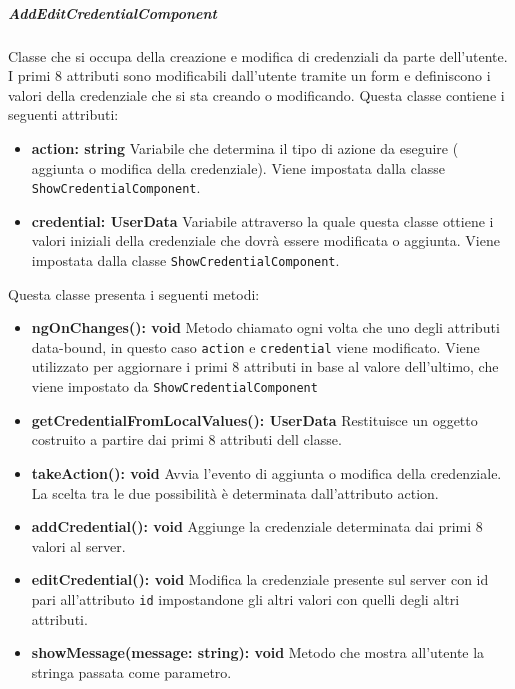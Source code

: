 \subparagraph{AddEditCredentialComponent}
Classe che si occupa della creazione e modifica di credenziali da parte dell'utente. I primi 8 attributi sono modificabili dall'utente tramite un form e definiscono i valori della credenziale che si sta creando o modificando. \newline
Questa classe contiene i seguenti attributi:
\begin{itemize}
	\item \textbf{action: string} \newline
	Variabile che determina il tipo di azione da eseguire ( aggiunta o modifica della credenziale). Viene impostata dalla classe \texttt{ShowCredentialComponent}.
	\item \textbf{credential: UserData} \newline
	Variabile attraverso la quale questa classe ottiene i valori iniziali della credenziale che dovrà essere modificata o aggiunta. Viene impostata dalla classe \texttt{ShowCredentialComponent}.
\end{itemize}
Questa classe presenta i seguenti metodi:
\begin{itemize}
	\item \textbf{ngOnChanges(): void} \newline
	Metodo chiamato ogni volta che uno degli attributi data-bound, in questo caso \texttt{action} e \texttt{credential} viene modificato. Viene utilizzato per aggiornare i primi 8 attributi in base al valore dell'ultimo, che viene impostato da \texttt{ShowCredentialComponent}
	\item \textbf{getCredentialFromLocalValues(): UserData} \newline
	Restituisce un oggetto costruito a partire dai primi 8 attributi dell classe.
	\item \textbf{takeAction(): void} \newline
	Avvia l'evento di aggiunta o modifica della credenziale. La scelta tra le due possibilità è determinata dall'attributo action.
	\item \textbf{addCredential(): void} \newline
	Aggiunge la credenziale determinata dai primi 8 valori al server.
	\item \textbf{editCredential(): void} \newline
	Modifica la credenziale presente sul server con id pari all'attributo \texttt{id} impostandone gli altri valori con quelli degli altri attributi.
	\item \textbf{showMessage(message: string): void} \newline
	Metodo che mostra all'utente la stringa passata come parametro.
\end{itemize}
